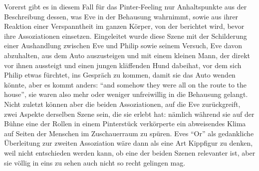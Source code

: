 \documentclass[fontsize=12pt]{scrartcl}
\begin{document}
Vorerst gibt es in diesem Fall f\"ur das Pinter-Feeling nur Anhaltspunkte aus der Beschreibung dessen, was Eve in der Behausung wahrnimmt, sowie aus ihrer Reaktion einer Verspanntheit im ganzen K\"orper, von der berichtet wird, bevor ihre Assoziationen einsetzen. Eingeleitet wurde diese Szene mit der Schil\-derung einer Aushandlung zwischen Eve und Philip sowie seinem Versuch, Eve davon abzuhalten, aus dem Auto auszusteigen und mit einem kleinen Mann, der direkt vor ihnen aussteigt und einen jungen kl\"affenden Hund dabeihat, vor dem sich Philip etwas f\"urchtet, ins Gespr\"ach zu kommen, damit sie das Auto wenden k\"onnte, aber es kommt anders: "`and somehow they were all on the route to the house"', sie waren also mehr oder weniger unfreiwillig in die Behausung gelangt. Nicht zu\-letzt k\"onnen aber die beiden Assoziationen, auf die Eve zur\"uckgreift, zwei Aspekte derselben Szene sein, die sie erlebt hat: n\"amlich w\"ahrend sie auf der B\"uhne eine der Rollen in einem Pinterst\"uck verk\"orperte ein abweisendes Klima auf Sei\-ten der Menschen im Zuschauerraum zu sp\"uren. Eves "`Or"' als gedankliche \"Uberleitung zur zwei\-ten Assoziation w\"are dann als eine Art Kippfigur zu denken, weil nicht entschieden werden kann, ob eine der beiden Szenen relevanter ist, aber sie v\"ollig in eins zu sehen auch nicht so recht gelingen mag. 
\end{document}
